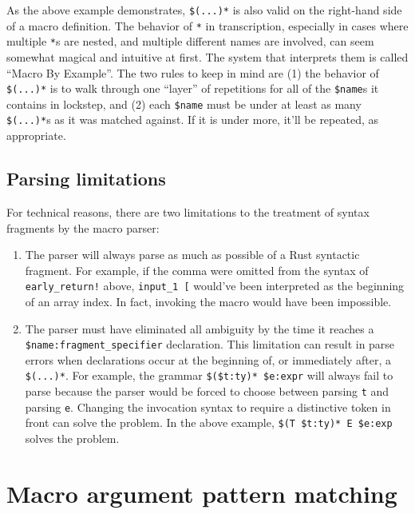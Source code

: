 \documentclass[]{article}
\begin{document}
As the above example demonstrates, \texttt{\$(...)*} is also valid on
the right-hand side of a macro definition. The behavior of \texttt{*} in
transcription, especially in cases where multiple \texttt{*}s are
nested, and multiple different names are involved, can seem somewhat
magical and intuitive at first. The system that interprets them is
called ``Macro By Example''. The two rules to keep in mind are (1) the
behavior of \texttt{\$(...)*} is to walk through one ``layer'' of
repetitions for all of the \texttt{\$name}s it contains in lockstep, and
(2) each \texttt{\$name} must be under at least as many
\texttt{\$(...)*}s as it was matched against. If it is under more, it'll
be repeated, as appropriate.

\subsection{Parsing limitations}\label{parsing-limitations}

For technical reasons, there are two limitations to the treatment of
syntax fragments by the macro parser:

\begin{enumerate}
\def\labelenumi{\arabic{enumi}.}
\itemsep1pt\parskip0pt
\item
  The parser will always parse as much as possible of a Rust syntactic
  fragment. For example, if the comma were omitted from the syntax of
  \texttt{early\_return!} above, \texttt{input\_1 {[}} would've been
  interpreted as the beginning of an array index. In fact, invoking the
  macro would have been impossible.
\item
  The parser must have eliminated all ambiguity by the time it reaches a
  \texttt{\$name:fragment\_specifier} declaration. This limitation can
  result in parse errors when declarations occur at the beginning of, or
  immediately after, a \texttt{\$(...)*}. For example, the grammar
  \texttt{\$(\$t:ty)* \$e:expr} will always fail to parse because the
  parser would be forced to choose between parsing \texttt{t} and
  parsing \texttt{e}. Changing the invocation syntax to require a
  distinctive token in front can solve the problem. In the above
  example, \texttt{\$(T \$t:ty)* E \$e:exp} solves the problem.
\end{enumerate}

\section{Macro argument pattern
matching}\label{macro-argument-pattern-matching}
\end{document}
